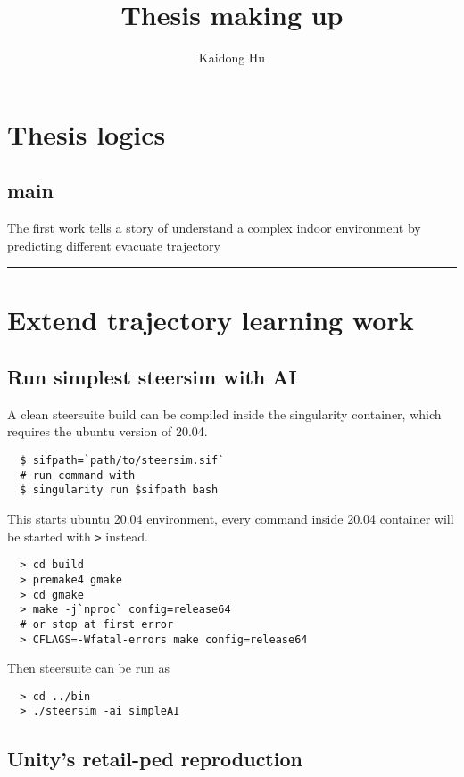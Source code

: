 \documentclass{report}
\title{Thesis making up}
\author{Kaidong Hu}
\begin{document}
\maketitle
\tableofcontents

\chapter{Thesis logics}
\section{main}

The first work tells a story of understand a complex indoor environment by 
predicting different evacuate trajectory

\noindent\rule{\linewidth}{1pt}

\chapter{Extend trajectory learning work}

\section{Run simplest steersim with AI}

A clean steersuite build can be compiled inside the singularity container, 
which requires the ubuntu version of 20.04.

\begin{verbatim}
  $ sifpath=`path/to/steersim.sif`
  # run command with
  $ singularity run $sifpath bash
\end{verbatim}

This starts ubuntu 20.04 environment, every command inside 20.04 container will 
be started with \texttt{>} instead.

\begin{verbatim}
  > cd build
  > premake4 gmake
  > cd gmake
  > make -j`nproc` config=release64
  # or stop at first error
  > CFLAGS=-Wfatal-errors make config=release64
\end{verbatim}

Then steersuite can be run as
\begin{verbatim}
  > cd ../bin
  > ./steersim -ai simpleAI
\end{verbatim}

\section{Unity's retail-ped reproduction}
\end{document}
